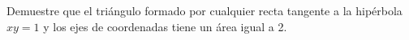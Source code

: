 \setcounter{enumi}{86}
\item Demuestre que el triángulo formado por cualquier recta tangente a la hipérbola $xy = 1$ y los ejes de coordenadas tiene un área igual a 2.
